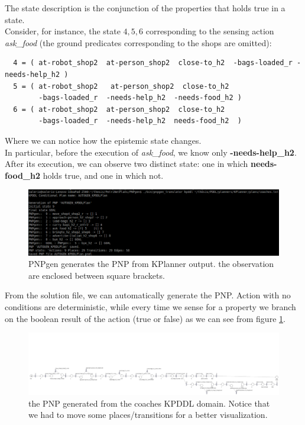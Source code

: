 \documentclass[pdftex,12pt,a4paper]{report}
\begin{document}
\noindent The state description is the conjunction of the properties that holds true in a state.\\ 
Consider, for instance, the state $4,5,6$ corresponding to the sensing action \textit{ask\_food} (the ground predicates corresponding to the shops are omitted): 
\begin{verbatim}
  4 = ( at-robot_shop2  at-person_shop2  close-to_h2  -bags-loaded_r -needs-help_h2 )
  5 = ( at-robot_shop2   at-person_shop2  close-to_h2  
        -bags-loaded_r  -needs-help_h2  -needs-food_h2 )
  6 = ( at-robot_shop2  at-person_shop2  close-to_h2  
        -bags-loaded_r  -needs-help_h2  needs-food_h2  )
\end{verbatim}
Where we can notice how the epistemic state changes.\\ 
In particular, before the execution of  \textit{ask\_food}, we know only \textbf{-needs-help\_h2}. After its execution, we can observe two distinct state: one in which \textbf{needs-food\_h2} holds true, and one in which not.

\begin{figure}[H]
	\centering
	\includegraphics[scale=0.4]{images/kpddl_coaches.png}
	\caption{PNPgen generates the PNP from KPlanner output. the observation are enclosed between square brackets.}
\end{figure}

\noindent From the solution file, we can automatically generate the PNP. Action with no conditions are deterministic, while every time we sense for a property we branch on the boolean result of the action (true or false) as we can see from figure \ref{fig:coaches_kpddlgen}.\\
 
\newpage
\begin{figure}[H]
	\centering
	\includegraphics[scale=0.21, angle=270, trim=100mm -100mm 0mm 0mm]{images/coaches_kpddl.png}
	\caption{the PNP generated from the coaches KPDDL domain. Notice that we had to move some places/transitions for a better visualization.}
	\label{fig:coaches_kpddlgen}
\end{figure}
\newpage
\end{document}

